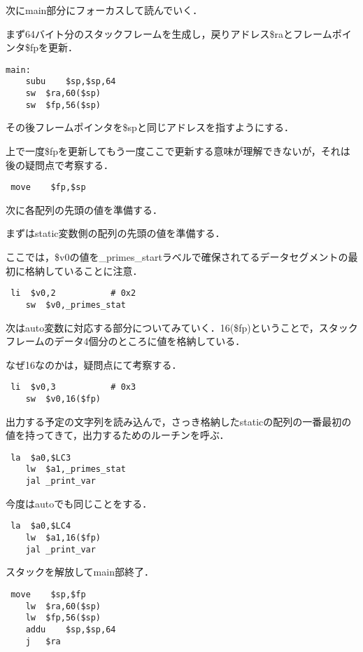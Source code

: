 \documentclass[a4j]{jarticle}
\begin{document}
次にmain部分にフォーカスして読んでいく．

まず64バイト分のスタックフレームを生成し，戻りアドレス\$raとフレームポインタ\$fpを更新．

\begin{verbatim}
main:
    subu    $sp,$sp,64
    sw  $ra,60($sp)
    sw  $fp,56($sp)
\end{verbatim}

その後フレームポインタを\$spと同じアドレスを指すようにする．

上で一度\$fpを更新してもう一度ここで更新する意味が理解できないが，それは後の疑問点で考察する．

\begin{verbatim}
 move    $fp,$sp
\end{verbatim}

次に各配列の先頭の値を準備する．

まずはstatic変数側の配列の先頭の値を準備する．

ここでは，\$v0の値を\_primes\_startラベルで確保されてるデータセグメントの最初に格納していることに注意．


\begin{verbatim}
 li  $v0,2           # 0x2
    sw  $v0,_primes_stat
\end{verbatim}

次はauto変数に対応する部分についてみていく．16(\$fp)ということで，スタックフレームのデータ4個分のところに値を格納している．

なぜ16なのかは，疑問点にて考察する．

\begin{verbatim}
 li  $v0,3           # 0x3
    sw  $v0,16($fp)
\end{verbatim}

出力する予定の文字列を読み込んで，さっき格納したstaticの配列の一番最初の値を持ってきて，出力するためのルーチンを呼ぶ．

\begin{verbatim}
 la  $a0,$LC3
    lw  $a1,_primes_stat
    jal _print_var
\end{verbatim}

今度はautoでも同じことをする．

\begin{verbatim}
 la  $a0,$LC4
    lw  $a1,16($fp)
    jal _print_var
\end{verbatim}

スタックを解放してmain部終了．

\begin{verbatim}
 move    $sp,$fp
    lw  $ra,60($sp)
    lw  $fp,56($sp)
    addu    $sp,$sp,64
    j   $ra
\end{verbatim}
\end{document}
